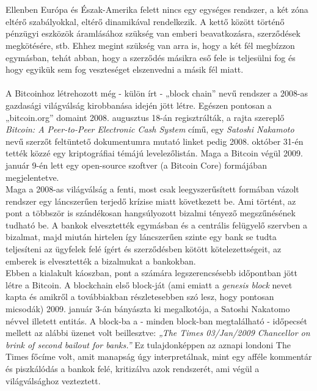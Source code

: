 \documentclass[11pt,a4paper]{article}
\newcommand{\q}[1]{„#1''} %
\begin{document}
\\ \\
Ellenben Európa és Észak-Amerika felett nincs egy egységes rendszer, a két zóna eltérő szabályokkal, eltérő dinamikával rendelkezik. A kettő között történő pénzügyi eszközök áramlásához szükség van emberi beavatkozásra, szerződések megkötésére, stb. Ehhez megint szükség van arra is, hogy a két fél megbízzon egymásban, tehát abban, hogy a szerződés másikra eső fele is teljesülni fog és hogy egyikük sem fog veszteséget elszenvedni a másik fél miatt.
\\ \\
A Bitcoinhoz létrehozott még - külön írt - \q{block chain} nevű rendszer a 2008-as gazdasági világválság kirobbanása idején jött létre. Egészen pontosan a \q{bitcoin.org} domaint 2008. augusztus 18-án regisztrálták, a rajta szereplő \textit{Bitcoin: A Peer-to-Peer Electronic Cash System} című, egy \textit{Satoshi Nakamoto} nevű szerzőt feltüntető dokumentumra mutató linket pedig 2008. október 31-én tették közzé egy kriptográfiai témájú levelezőlistán. Maga a Bitcoin végül 2009. január 9-én lett egy open-source szoftver (a Bitcoin Core) formájában megjelentetve. \\
Maga a 2008-as világválság a fenti, most csak leegyszerűsített formában vázolt rendszer egy láncszerűen terjedő krízise miatt következett be. Ami történt, az pont a többször is szándékosan hangsúlyozott bizalmi tényező megszűnésének tudható be. A bankok elvesztették egymásban és a centrális felügyelő szervben a bizalmat, majd miután hirtelen így láncszerűen szinte egy bank se tudta teljesíteni az ügyfelek felé ígért és szerződésben kötött kötelezettségeit, az emberek is elvesztették a bizalmukat a bankokban. \\
Ebben a kialakult káoszban, pont a számára legszerencsésebb időpontban jött létre a Bitcoin. A blockchain első block-ját (ami emiatt a \textit{genesis block} nevet kapta és amikről a továbbiakban részletesebben szó lesz, hogy pontosan micsodák) 2009. január 3-án bányászta ki megalkotója, a Satoshi Nakatomo névvel illetett entitás. A block-ba a - minden block-ban megtalálható - időpecsét mellett az alábbi üzenet volt beillesztve: \textit{\q{The Times 03/Jan/2009 Chancellor on brink of second bailout for banks.}} Ez tulajdonképpen az aznapi londoni The Times főcíme volt, amit manapság úgy interpretálnak, mint egy afféle kommentár és piszkálódás a bankok felé, kritizálva azok rendszerét, ami végül a világválsághoz vezteztett.
\end{document}
